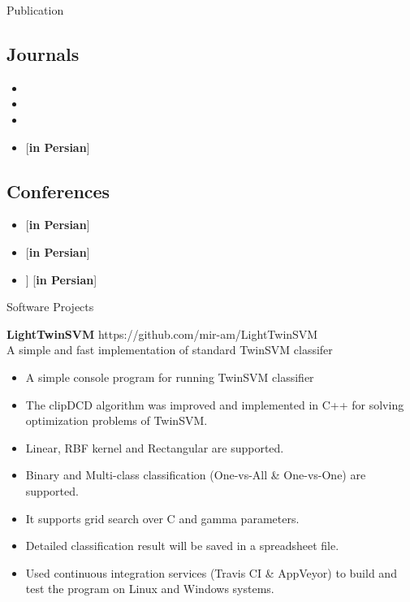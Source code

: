 \documentclass{resume} %
\newcommand{\perspaper}{[\textbf{in Persian}]}
\begin{document}
\begin{rSection}{Publication}
\subsection*{Journals}
\begin{itemize}
	\item {}
	\item {}
	\item {}
	\item {} \perspaper
\end{itemize}

\subsection*{Conferences}
\begin{itemize}
	\item {} \perspaper
	\item {} \perspaper
	\item {} ] \perspaper
\end{itemize}	
\end{rSection}

\begin{rSection}{Software Projects}
	
	{\bf LightTwinSVM} \hfill { https://github.com/mir-am/LightTwinSVM} \\ 
	A simple and fast implementation of standard TwinSVM classifer  \\
	
	\begin{itemize}
	\item A simple console program for running TwinSVM classifier
	\item The clipDCD algorithm was improved and implemented in C++ for solving optimization problems of TwinSVM.
	\item Linear, RBF kernel and Rectangular are supported.
	\item Binary and Multi-class classification (One-vs-All \& One-vs-One) are supported.
	\item It supports grid search over C and gamma parameters.
	\item Detailed classification result will be saved in a spreadsheet file.
	\item Used continuous integration services (Travis CI \& AppVeyor) to build and test the program on Linux and Windows systems.

	\end{itemize}
	
\end{rSection}
\end{document}
